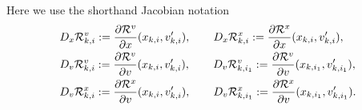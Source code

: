 \documentclass[12pt,nopreprintline]{elsarticle}
\begin{document}
Here we use the shorthand Jacobian notation
\begin{equation}\label{eq:short_R}
\begin{aligned}
& D_x \mathcal R^v_{k,i} := \frac{\partial \mathcal R^v}{\partial x}(x_{k,i},v'_{k,i}),
\qquad  D_x \mathcal R^x_{k,i} := \frac{\partial \mathcal R^x}{\partial x}(x_{k,i},v'_{k,i}), \\
& D_v \mathcal R^v_{k,i} := \frac{\partial \mathcal R^v}{\partial v}(x_{k,i},v'_{k,i}),
\qquad  D_v \mathcal R^v_{k,i_1} := \frac{\partial \mathcal R^v}{\partial v}(x_{k,i_1},v'_{k,i_1}),\\
& D_v \mathcal R^x_{k,i} := \frac{\partial \mathcal R^x}{\partial v}(x_{k,i},v'_{k,i}),
\qquad  D_v \mathcal R^x_{k,i_1} := \frac{\partial \mathcal R^x}{\partial v}(x_{k,i_1},v'_{k,i_1}).
\end{aligned}
\end{equation}
\end{document}
